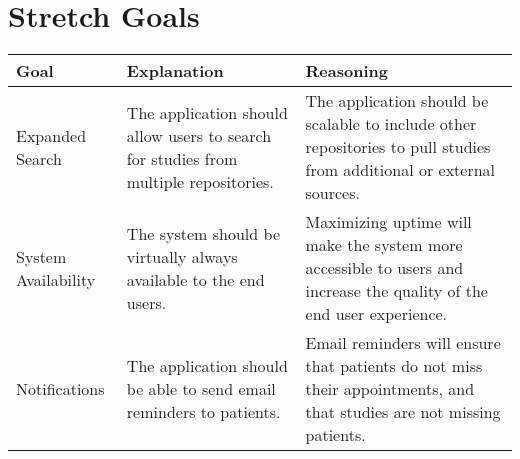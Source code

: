 \documentclass{article}
\begin{document}
\section{Stretch Goals}

\begin{table}[H]
\centering
\begin{tabular}{| p{3cm} | p{5cm} | p{5cm} |}
\hline
Goal & Explanation & Reasoning \\
\hline  \hline
Expanded Search & The application should allow users to search for studies from multiple repositories. & The application should be scalable to include other repositories to pull studies from additional or external sources. \\
\hline
System Availability & The system should be virtually always available to the end users. & Maximizing uptime will make the system more accessible to users and increase the quality of the end user experience. \\
\hline
Notifications & The application should be able to send email reminders to patients. & Email reminders will ensure that patients do not miss their appointments, and that studies are not missing patients. \\
\hline

\end{tabular}
\end{table}
\end{document}
